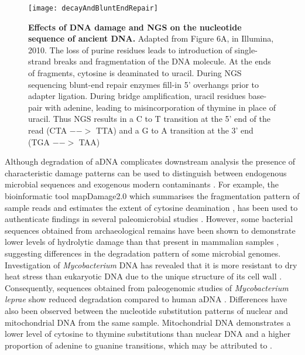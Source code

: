 \documentclass[12pt, a4paper]{article}
\begin{document}
\begin{figure}[H]
\centering
\singlespace
\texttt{[image: decayAndBluntEndRepair]}
\caption[Effects of DNA damage on next-generation sequencing data]{\textbf{Effects of DNA damage and NGS on the nucleotide sequence of ancient DNA.} Adapted from Figure 6A, in Illumina, 2010. \small{The loss of purine residues leads to introduction of single-strand breaks and fragmentation of the DNA molecule. At the ends of fragments, cytosine is deaminated to uracil. During NGS sequencing blunt-end repair enzymes fill-in 5' overhangs prior to adapter ligation. During bridge amplification, uracil residues base-pair with adenine, leading to misincorporation of thymine in place of uracil. Thus NGS results in a C to T transition at the 5' end of the read (CTA $-->$ TTA) and a G to A transition at the 3' end (TGA $-->$ TAA)} }
\end{figure}
\clearpage

Although degradation of aDNA complicates downstream analysis \cite{Kircher:2012aa} the presence of characteristic damage patterns can be used to distinguish between endogenous microbial sequences and exogenous modern contaminants \cite{Ginolhac:2011aa,Zaremba-Niedzwiedzka:2013aa}.
For example, the bioinformatic tool mapDamage2.0 \cite{Jonsson:2013aa} which summarises the fragmentation pattern of sample reads and estimates the extent of cytosine deamination \cite{Jonsson:2013aa}, has been used to authenticate findings in several paleomicrobial studies .
However, some bacterial sequences obtained from archaeological remains have been shown to demonstrate lower levels of hydrolytic damage than that present in mammalian samples \cite{Schuenemann:2013aa,Ziesemer:2015aa}, suggesting differences in the degradation pattern of some microbial genomes.
Investigation of \textit{Mycobacterium} DNA has revealed that it is more resistant to dry heat stress than eukaryotic DNA due to the unique structure of its cell wall \cite{Nguyen-Hieu:2012aa}.
Consequently, sequences obtained from paleogenomic studies of \textit{Mycobacterium leprae} show reduced degradation compared to human aDNA \cite{Schuenemann:2013aa}. 
Differences have also been observed between the nucleotide substitution patterns of nuclear and mitochondrial DNA from the same sample. 
Mitochondrial DNA demonstrates a lower level of cytosine to thymine substitutions than nuclear DNA and a higher proportion of adenine to guanine transitions, which may be attributed to  \cite{Binladen:2006aa}. 
\end{document}
